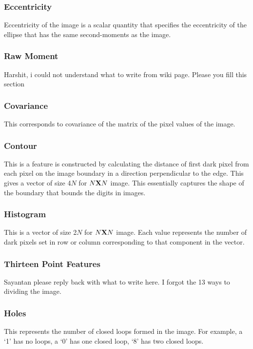 \documentclass[conference]{IEEEtran}
\begin{document}
\subsubsection{Eccentricity}
Eccentricity of the image is a scalar quantity that specifies the eccentricity of the ellipse that has the same second-moments as the image.

\subsubsection{Raw Moment}
Harshit, i could not understand what to write from wiki page. Please you fill this section

\subsubsection{Covariance}
This corresponds to covariance of the matrix of the pixel values of the image.

\subsubsection{Contour}
This is a feature is constructed by calculating the distance of first dark pixel from each pixel on the image boundary in a direction perpendicular to the edge. This gives a vector of size 4$N$ for $N{\bf X}N$ image. This essentially captures the shape of the boundary that bounds the digits in images.
  
\subsubsection{Histogram}
This is a vector of size 2$N$ for $N{\bf X}N$ image. Each value represents the number of dark pixels set in row or column corresponding to that component in the vector.

\subsubsection{Thirteen Point Features}
Sayantan please reply back with what to write here. I forgot the 13 ways to dividing the image.

\subsubsection{Holes}
This represents the number of closed loops formed in the image. For example, a `1' has no loops, a `0' has one closed loop, `8' has two closed loops.
\end{document}
